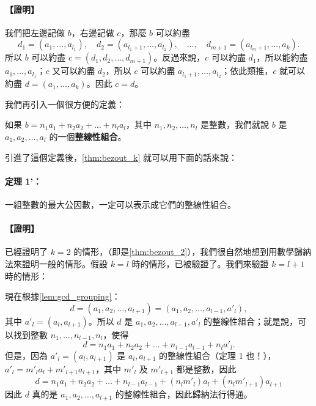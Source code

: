 \paragraph{【證明】}
我們把左邊記做 $b$，右邊記做 $c$，那麼 $b$ 可以約盡
\begin{equation*}
  d_1 = (a_1, \dots, a_{l_1}), \quad d_2 = (a_{l_1+1}, \dots, a_{l_2}), \quad \dots, \quad d_{m+1} = (a_{l_m+1}, \dots, a_k).
\end{equation*}
所以 $b$ 可以約盡 $c=(d_1, d_2, \dots, d_{m+1})$。反過來說，$c$ 可以約盡 $d_1$，所以能約盡 $a_1, \dots, a_{l_1}$；$c$ 又可以約盡 $d_2$，所以 $c$ 可以約盡 $a_{l_1+1}, \dots, a_{l_2}$；依此類推，$c$ 就可以約盡 $d=(a_1, \dots, a_k)$。因此 $c=d$。

我們再引入一個很方便的定義：

\begin{definition*}
如果 $b = n_1 a_1 + n_2 a_2 + \dots + n_l a_l$，其中 $n_1, n_2, \dots, n_l$ 是整數，我們就說 $b$ 是 $a_1, a_2, \dots, a_l$ 的一個\textbf{整線性組合}。
\end{definition*}

引進了這個定義後，\cref{thm:bezout_k} 就可以用下面的話來說：

\paragraph{定理 1'：}
一組整數的最大公因數，一定可以表示成它們的整線性組合。

\paragraph{【證明】}
已經證明了 $k=2$ 的情形，（即是\cref{thm:bezout_2}），我們很自然地想到用數學歸納法來證明一般的情形。假設 $k=l$ 時的情形，已被驗證了。我們來驗證 $k=l+1$ 時的情形：

現在根據\cref{lem:gcd_grouping}：
\begin{equation*}
  d = (a_1, a_2, \dots, a_{l+1}) = (a_1, a_2, \dots, a_{l-1}, a'_l),
\end{equation*}
其中 $a'_l = (a_l, a_{l+1})$。所以 $d$ 是 $a_1, a_2, \dots, a_{l-1}, a'_l$ 的整線性組合；就是說，可以找到整數 $n_1, \dots, n_{l-1}, n_l$，使得
\begin{equation*}
  d = n_1 a_1 + n_2 a_2 + \dots + n_{l-1} a_{l-1} + n_l a'_l.
\end{equation*}
但是，因為 $a'_l = (a_l, a_{l+1})$ 是 $a_l, a_{l+1}$ 的整線性組合（定理 1 也！），$a'_l = m'_l a_l + m'_{l+1} a_{l+1}$，其中 $m'_l$ 及 $m'_{l+1}$ 都是整數，因此
\begin{equation*}
  d = n_1 a_1 + n_2 a_2 + \dots + n_{l-1} a_{l-1} + (n_l m'_l) a_l + (n_l m'_{l+1}) a_{l+1}
\end{equation*}
因此 $d$ 真的是 $a_1, a_2, \dots, a_{l+1}$ 的整線性組合，因此歸納法行得通。

